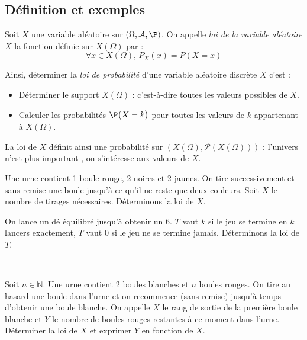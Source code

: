 \documentclass[a4paper,10pt]{report}
\begin{document}
\subsection{Définition et exemples}

\begin{defin}
Soit $X$ une variable aléatoire sur $(\Omega, \mathcal{A}, \P)$. On appelle \textit{loi de la variable aléatoire} $X$ la fonction définie sur $X(\Omega)$ par :
$$ \forall x \in X(\Omega), \, P_X(x) = P(X=x)$$
\end{defin}
\noindent Ainsi, déterminer la \textit{loi de probabilité} d'une variable aléatoire discrète $X$ c'est : 
 \begin{itemize}
  \item Déterminer le support $X(\Omega)$ : c'est-à-dire toutes les valeurs possibles de $X$.
  \item Calculer les probabilités $\P\big(X=k\big)$ pour toutes les valeurs de $k$ appartenant à $X(\Omega)$.
 \end{itemize}

\medskip

\begin{rem} La loi de $X$ définit ainsi une probabilité sur $(X(\Omega), \mathcal{P}(X(\Omega)))$ : l'univers n'est \og plus important \fg, on s'intéresse aux valeurs de $X$.
\end{rem}

\begin{ex} Une urne contient 1 boule rouge, 2 noires et 2 jaunes. On tire successivement et sans remise une boule jusqu'à ce qu'il ne reste que deux couleurs. Soit $X$ le nombre de tirages nécessaires. Déterminons la loi de $X$.

\vspace{10cm}
\end{ex}

\begin{ex} On lance un dé équilibré jusqu'à obtenir un 6. $T$ vaut $k$ si le jeu se termine en $k$ lancers exactement, $T$ vaut 0 si le jeu ne se termine jamais. Déterminons la loi de $T$.

\vspace{10cm}
\end{ex} 

\newpage

$\phantom{test}$

\vspace{6cm}

\begin{exa} Soit $n \in \mathbb{N}$. Une urne contient 2 boules blanches et $n$ boules rouges. On tire au hasard une boule dans l'urne et on recommence (sans remise) jusqu'à temps d'obtenir une boule blanche. On appelle $X$ le rang de sortie de la première boule blanche et $Y$ le nombre de boules rouges restantes à ce moment dans l'urne. Déterminer la loi de $X$ et exprimer $Y$ en fonction de $X$.
\end{exa} 
\end{document}
